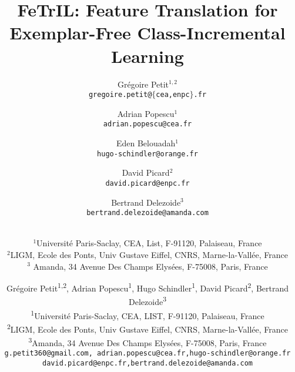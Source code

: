 \documentclass[10pt,twocolumn,letterpaper]{article}
\begin{document}
\title{FeTrIL: Feature Translation for Exemplar-Free Class-Incremental Learning}


\author{
    Grégoire Petit$^{1,2}$   \\{\tt\small gregoire.petit@$\{$cea,enpc$\}$.fr} \and 
    Adrian Popescu$^{1}$     \\{\tt\small adrian.popescu@cea.fr}          \and 
    Eden Belouadah$^{1}$     \\{\tt\small hugo-schindler@orange.fr}               \and 
    David Picard$^{2}$       \\{\tt\small david.picard@enpc.fr}           \and 
    Bertrand Delezoide$^{3}$ \\{\tt\small bertrand.delezoide@amanda.com}  \and   \\
    $^1$Université Paris-Saclay, CEA, List, F-91120, Palaiseau, France\\
    $^2$LIGM, Ecole des Ponts, Univ Gustave Eiffel, CNRS, Marne-la-Vallée, France\\
    $^3$ Amanda, 34 Avenue Des Champs Elysées, F-75008, Paris, France
}

\author{
Grégoire Petit\textsuperscript{1,2}, 
Adrian Popescu\textsuperscript{1}, 
Hugo Schindler\textsuperscript{1}, 
David Picard\textsuperscript{2},
Bertrand Delezoide\textsuperscript{3}\\
 \textsuperscript{1}Université Paris-Saclay, CEA, LIST, F-91120, Palaiseau, France\\
 \textsuperscript{2}LIGM, Ecole des Ponts, Univ Gustave Eiffel, CNRS, Marne-la-Vallée, France\\
 \textsuperscript{3}Amanda, 34 Avenue Des Champs Elysées, F-75008, Paris, France\\
{\tt\small g.petit360@gmail.com, adrian.popescu@cea.fr,hugo-schindler@orange.fr}\\
{\tt\small david.picard@enpc.fr,bertrand.delezoide@amanda.com}
}


\maketitle
\thispagestyle{empty}
\end{document}
